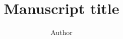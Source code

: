 \documentclass{article}
\title{Manuscript title}
\author{Author}
\date{}
\begin{document}
\maketitle
\begin{abstract}
\end{abstract}
\nocite{*}


\end{document}
